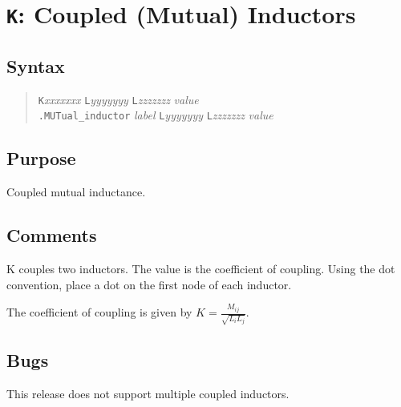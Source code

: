 %
%
%
%
\section{{\tt K}: Coupled (Mutual) Inductors}
\subsection{Syntax}
\begin{verse}
{\tt K}{\it xxxxxxx} {\tt L}{\it yyyyyyy} {\tt L}{\it zzzzzzz} {\it value}\\
{\tt .MUTual\_inductor} {\it label} {\tt L}{\it yyyyyyy} {\tt L}{\it zzzzzzz}
	{\it value}
\end{verse}
\subsection{Purpose}

Coupled mutual inductance.
\subsection{Comments}

K couples two inductors.  The value is the coefficient of coupling.  Using the dot convention, place a dot on the first node of each inductor.

The coefficient of coupling is given by $K = \frac{M_{ij}}{\sqrt{L_i L_j}}$.
\subsection{Bugs}

This release does not support multiple coupled inductors.
